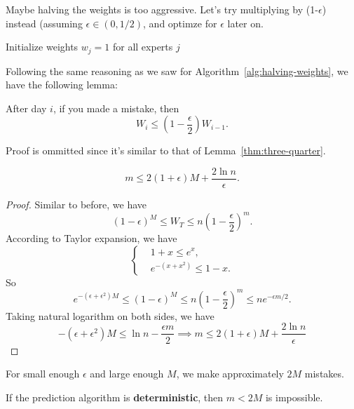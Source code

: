 Maybe halving the weights is too aggressive. Let's try multiplying by (1-$\epsilon$) instead (assuming $\epsilon \in (0, 1/2)$, and optimze for $\epsilon$ later on.

\begin{algorithm}[H]
    \caption{Deterministic MWU Algorithm}
    \label{alg:deterministic-weights}
    Initialize weights $w_j = 1$ for all experts $j$\;
\end{algorithm}

Following the same reasoning as we saw for Algorithm~\ref{alg:halving-weights}, we have the following lemma:

\begin{lemma}\label{thm:one-minus-eps}
  After day $i$, if you made a mistake, then
  \[ W_i \leq \left(1 - \frac{\epsilon}{2}\right) W_{i-1}. \]
\end{lemma}
Proof is ommitted since it's similar to that of Lemma~\ref{thm:three-quarter}.

\begin{theorem}
  \[ m \leq 2(1+\epsilon) M + \frac{2 \ln n}{\epsilon}. \]
  \end{theorem}

\begin{proof}
  Similar to before, we have
  \[ (1 - \epsilon)^M \leq W_T \leq n \left(1 - \frac{\epsilon}{2}\right)^m. \]
  According to Taylor expansion, we have
  \[ \left\{ \begin{aligned}
    &1+x \leq e^x,\\
    &e^{-(x+x^2)}\leq 1 - x.
    \end{aligned} \right. \]
    So
    \[ e^{-(\epsilon + \epsilon^2) M} \leq (1-\epsilon)^M \leq n \left(1 - \frac{\epsilon}{2}\right)^m \leq n e^{-\epsilon m/2}. \]
    Taking natural logarithm on both sides, we have
    \[ -(\epsilon + \epsilon^2) M \leq \ln n - \frac{\epsilon m}{2} \implies m \leq 2(1+\epsilon) M + \frac{2 \ln n}{\epsilon}\]
\end{proof}

\begin{remark}
  For small enough $\epsilon$ and large enough $M$, we make approximately $2M$ mistakes.
\end{remark}

\begin{theorem} \label{thm:deterministic-lower-bound}
  If the prediction algorithm is \textbf{deterministic}, then $m<2M$ is impossible.
\end{theorem}

